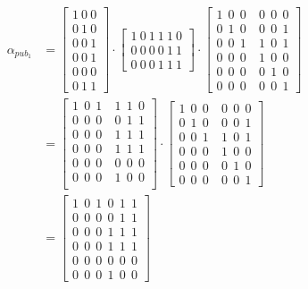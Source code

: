 \begin{equation}\label{eq:ej-alpha-pub-1}
	\begin{aligned}
	{\alpha_{pub_1}}  & =  
	\left[\begin{array}{c}
		1\ 0\ 0\\
		0\ 1\ 0\\
		0\ 0\ 1\\
		\hline
		0\ 0\ 1\\
		0\ 0\ 0\\
		0\ 1\ 1
	\end{array}\right]
	\cdot
	\left[\begin{array}{c}
		1\ 0\ 1\ 1\ 1\ 0\\
		0\ 0\ 0\ 0\ 1\ 1\\
		0\ 0\ 0\ 1\ 1\ 1
	\end{array}\right]
	\cdot
	\left[\begin{array}{c|c}
		1\ \ 0\ \ 0\ & 0\ \ 0\ \ 0\\
		0\ \ 1\ \ 0\ & 0\ \ 0\ \ 1\\
		0\ \ 0\ \ 1\ & 1\ \ 0\ \ 1\\
		\hline
		0\ \ 0\ \ 0\ & 1\ \ 0\ \ 0\\
		0\ \ 0\ \ 0\ & 0\ \ 1\ \ 0\\
		0\ \ 0\ \ 0\ & 0\ \ 0\ \ 1
	\end{array}\right] \\
	& = \left[\begin{array}{c|c}
		1\ \ 0\ \ 1\ & 1\ \ 1\ \ 0\\
		0\ \ 0\ \ 0\ & 0\ \ 1\ \ 1\\
		0\ \ 0\ \ 0\ & 1\ \ 1\ \ 1\\
		\hline
		0\ \ 0\ \ 0\ & 1\ \ 1\ \ 1\\
		0\ \ 0\ \ 0\ & 0\ \ 0\ \ 0\\
		0\ \ 0\ \ 0\ & 1\ \ 0\ \ 0\\
	\end{array}\right]
	\cdot
	\left[\begin{array}{c|c}
		1\ \ 0\ \ 0\ & 0\ \ 0\ \ 0\\
		0\ \ 1\ \ 0\ & 0\ \ 0\ \ 1\\
		0\ \ 0\ \ 1\ & 1\ \ 0\ \ 1\\
		\hline
		0\ \ 0\ \ 0\ & 1\ \ 0\ \ 0\\
		0\ \ 0\ \ 0\ & 0\ \ 1\ \ 0\\
		0\ \ 0\ \ 0\ & 0\ \ 0\ \ 1
	\end{array}\right]\\
	& = \left[\begin{array}{c}
		1\ \ 0\ \ 1\ \ 0\ \ 1\ \ 1\\
		0\ \ 0\ \ 0\ \ 0\ \ 1\ \ 1\\
		0\ \ 0\ \ 0\ \ 1\ \ 1\ \ 1\\
		0\ \ 0\ \ 0\ \ 1\ \ 1\ \ 1\\
		0\ \ 0\ \ 0\ \ 0\ \ 0\ \ 0\\
		0\ \ 0\ \ 0\ \ 1\ \ 0\ \ 0
	\end{array}\right]
	\end{aligned}
\end{equation}

